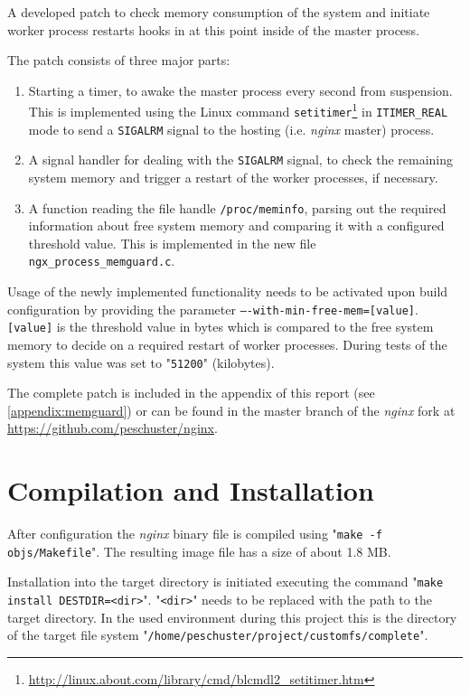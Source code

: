 A developed patch to check memory consumption of the system and initiate worker process restarts hooks in at this point inside of the master process. 

The patch consists of three major parts:

\begin{enumerate}

\item Starting a timer, to awake the master process every second from suspension. This is implemented using the Linux command \texttt{setitimer}\footnote{\url{http://linux.about.com/library/cmd/blcmdl2\_setitimer.htm}} in \texttt{ITIMER\_REAL} mode to send a \texttt{SIGALRM} signal to the hosting (i.e. \textit{nginx} master) process.

\item A signal handler for dealing with the \texttt{SIGALRM} signal, to check the remaining system memory and trigger a restart of the worker processes, if necessary.

\item A function reading the file handle \texttt{/proc/meminfo}, parsing out the required information about free system memory and comparing it with a configured threshold value. This is implemented in the new file \texttt{ngx\_process\_memguard.c}.
\end{enumerate}

Usage of the newly implemented functionality needs to be activated upon build configuration by providing the parameter \texttt{----with-min-free-mem=[value]}. \texttt{[value]} is the threshold value in bytes which is compared to the free system memory to decide on a required restart of worker processes. During tests of the system this value was set to "\texttt{51200}" (kilobytes).

The complete patch is included in the appendix of this report (see \ref{appendix:memguard}) or can be found in the master branch of the \textit{nginx} fork at \url{https://github.com/peschuster/nginx}.

\section{Compilation and Installation}

After configuration the \textit{nginx} binary file is compiled using "\texttt{make -f objs/Makefile}". The resulting image file has a size of about 1.8 MB.

Installation into the target directory is initiated executing the command "\texttt{make install DESTDIR=<dir>}". "\texttt{<dir>}" needs to be replaced with the path to the target directory. In the used environment during this project this is the directory of the target file system "\texttt{/home/peschuster/project/customfs/complete}".

